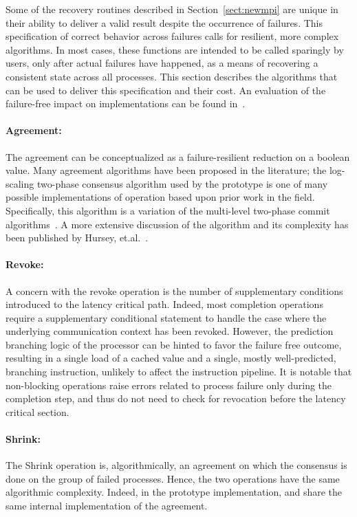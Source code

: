 Some of the recovery routines described in Section~\ref{sect:newmpi} are
unique in their ability to deliver a valid result despite the occurrence
of failures. This specification of correct behavior across failures calls
for resilient, more complex algorithms. In most cases, these functions
are intended to be called sparingly by users, only after actual failures have
happened, as a means of recovering a consistent state across all
processes. This section describes the algorithms that
can be used to deliver this specification and their cost. 
An evaluation of the failure-free impact on implementations can be found in~\cite{Bland:2012tp}.

\paragraph*{Agreement:}
\label{subsect:agreement}

The agreement can be conceptualized as a failure-resilient reduction on
a boolean value. Many agreement algorithms have been proposed in the 
literature; the log-scaling two-phase consensus algorithm used by the \ulfm
prototype is one of many possible implementations of
 operation based upon prior work in the field.
Specifically, this algorithm is a variation of the multi-level two-phase
commit algorithms~\cite{Mohan_1985}. A more extensive discussion of the
algorithm and its complexity has been published by Hursey,
et.al.~\cite{Hursey11LogConsensus}.

\paragraph*{Revoke:}
\label{subsect:revoke}

A concern with the revoke operation is the number of supplementary
conditions introduced to the latency critical path. Indeed, most completion operations
require a supplementary conditional statement to handle the case where the
underlying communication context has been revoked. However, the prediction
branching logic of the processor can be hinted to favor the failure free
outcome, resulting in a single load of a cached value and a single, mostly
well-predicted, branching instruction, unlikely to affect the instruction
pipeline. It is notable that non-blocking operations raise errors related to
process failure only during the completion step, and thus do not need to check
for revocation before the latency critical section.

\paragraph*{Shrink:} The Shrink operation is, algorithmically, an agreement on
which the consensus is done on the group of failed processes.
Hence, the two operations have the same algorithmic complexity. Indeed, in the
prototype implementation,  and
 share the same internal implementation of the
agreement.
